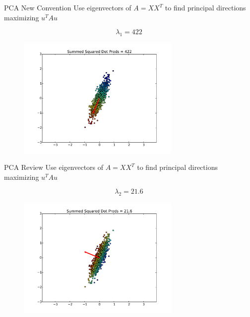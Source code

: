 \documentclass{beamer}
\begin{document}
\begin{frame}{PCA New Convention}
Use eigenvectors of $A = XX^T$ to find principal directions maximizing $u^TAu$

\[\lambda_1 = 422 \]
\begin{figure}[t]
\centering
\includegraphics[width=0.7\textwidth]{2DPCADirMax.pdf}
\end{figure}


\end{frame}

\begin{frame}{PCA Review}
Use eigenvectors of $A = XX^T$ to find principal directions maximizing $u^TAu$

\[\lambda_2 = 21.6 \]
\begin{figure}[t]
\centering
\includegraphics[width=0.7\textwidth]{2DPCADirMin.pdf}
\end{figure}


\end{frame}
\end{document}
